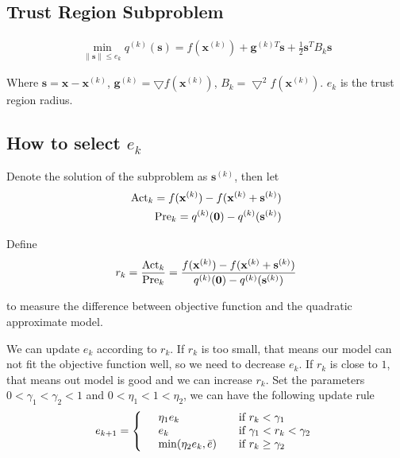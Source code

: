 \subsection{Trust Region Subproblem}
\begin{align}
    \min_{\parallel \mathbf{s} \parallel \leq e_k} q^{(k)}(\mathbf{s})
     = f(\mathbf{x}^{(k)}) + \mathbf{g}^{(k)T}\mathbf{s}
    + \frac{1}{2} \mathbf{s}^T B_k \mathbf{s}
\end{align}

Where $\mathbf{s} = \mathbf{x} - \mathbf{x}^{(k)}$,
$\mathbf{g}^{(k)} = \bigtriangledown f(\mathbf{x}^{(k)})$,
$B_k = \bigtriangledown^2 f(\mathbf{x}^{(k)})$.
$e_k$ is the trust region radius.

\par
\subsection{How to select $e_k$}
\par
Denote the solution of the subproblem as $\mathbf{s}^{(k)}$,
then let
\begin{align}
    \textnormal{Act}_k = f(\mathbf{x}^{(k)}) - f(\mathbf{x}^{(k)} + \mathbf{s}^{(k)}) \\
    \textnormal{Pre}_k = q^{(k)}(\mathbf{0}) - q^{(k)}(\mathbf{s}^{(k)}) 
\end{align}

Define
\begin{align}
    r_k = \frac{\textnormal{Act}_k}{\textnormal{Pre}_k}
    = \frac{f(\mathbf{x}^{(k)}) - f(\mathbf{x}^{(k)} + \mathbf{s}^{(k)})}
    {q^{(k)}(\mathbf{0}) - q^{(k)}(\mathbf{s}^{(k)})}
\end{align}

to measure the difference between objective function
and the quadratic approximate model.
\par
We can update $e_k$ according to $r_k$. If $r_k$ is too small,
that means our model can not fit the objective function well,
so we need to decrease $e_k$. If $r_k$ is close to $1$,
that means out model is good and we can increase $r_k$.
Set the parameters $0 < \gamma_1 < \gamma_2 < 1$ and 
$0 < \eta_1 < 1 < \eta_2$, we can have the following update
rule
\begin{align}
    e_{k+1} = \left\{
        \begin{array}{lll}
            &\eta_1 e_k &\textnormal{if} \ r_k < \gamma_1 \\
            &e_k &\textnormal{if} \ \gamma_1 < r_k < \gamma_2 \\
            &\min(\eta_2 e_k, \bar{e}) \quad &\textnormal{if} \ r_k \geq \gamma_2
        \end{array}\right.
\end{align}

